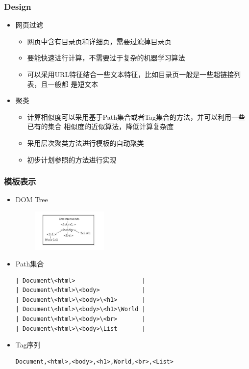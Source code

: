 \documentclass[11pt,presentation]{beamer}
\begin{document}
\begin{frame}
\frametitle{Design}
\label{sec-2-3}
\begin{itemize}

\item 网页过滤
\label{sec-2-3-1}%
\begin{itemize}
\item 网页中含有目录页和详细页，需要过滤掉目录页
\item 要能快速进行计算，不需要过于复杂的机器学习算法
\item 可以采用URL特征结合一些文本特征，比如目录页一般是一些超链接列表，且一般都
      是短文本
\end{itemize}

\item 聚类
\label{sec-2-3-2}%
\begin{itemize}
\item 计算相似度可以采用基于Path集合或者Tag集合的方法，并可以利用一些已有的集合
       相似度的近似算法，降低计算复杂度
\item 采用层次聚类方法进行模板的自动聚类
\item 初步计划参照\cite{4,5,6}的方法进行实现
\end{itemize}
\end{itemize} %
\end{frame}
\begin{frame}[fragile]
\frametitle{模板表示}
\label{sec-2-4}
\begin{itemize}

\item DOM Tree
\label{sec-2-4-1}%
\begin{figure}[htb]
    \centering
    \includegraphics[width=10em,angle=0]{./Selection_001.png}
    \end{figure}

\item Path集合\\
\label{sec-2-4-2}%
\tiny

\begin{verbatim}
| Document\<html>                   |
| Document\<html>\<body>            |
| Document\<html>\<body>\<h1>       |
| Document\<html>\<body>\<h1>\World |
| Document\<html>\<body>\<br>       |
| Document\<html>\<body>\List       |
\end{verbatim}
\normalsize

\item Tag序列\\
\label{sec-2-4-3}%
\tiny

\begin{verbatim}
Document,<html>,<body>,<h1>,World,<br>,<List>
\end{verbatim}
\end{itemize} %
\end{frame}
\end{document}
